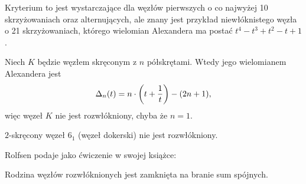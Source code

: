 Kryterium to jest wystarczające dla węzłów pierwszych o co najwyżej 10 skrzyżowaniach oraz alternujących, ale znany jest przykład niewłóknistego węzła o 21 skrzyżowaniach, którego wielomian Alexandera ma postać $t^4 - t^3 + t^2 - t +1$.

\begin{proposition}
%
    Niech $K$ będzie węzłem skręconym z $n$ półskrętami.
    Wtedy jego wielomianem Alexandera jest
    \begin{equation}
        \Delta_n(t) = n \cdot \left(t + \frac 1 t \right) - (2n+1),
    \end{equation}
    więc węzeł $K$ nie jest rozwłókniony, chyba że $n = 1$.
\end{proposition}

\begin{corollary}
    $2$-skręcony węzeł $6_1$ (węzeł dokerski) nie jest rozwłókniony.
\end{corollary}

Rolfsen \cite[s. 326]{rolfsen76} podaje jako ćwiczenie w swojej książce:

\begin{proposition}
    Rodzina węzłów rozwłóknionych jest zamknięta na branie sum spójnych.
\end{proposition}

%



